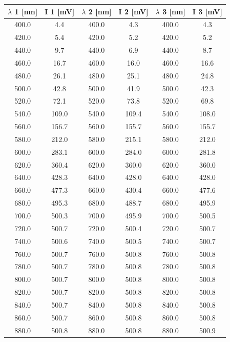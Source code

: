 \documentclass[]{article}
\begin{document}
\begin{table}[H]
\centering
\begin{tabular}{|c|c||c|c||c|c|}
\hline
$\lambda$ 1 [nm] & I 1 [mV] & $\lambda$ 2 [nm] & I 2 [mV] & $\lambda$ 3 [nm] & I 3 [mV] \\ \hline\hline
400.0 & 4.4 & 400.0 & 4.3 & 400.0 & 4.3 \\ \hline
420.0 & 5.4 & 420.0 & 5.2 & 420.0 & 5.2 \\ \hline
440.0 & 9.7 & 440.0 & 6.9 & 440.0 & 8.7 \\ \hline
460.0 & 16.7 & 460.0 & 16.0 & 460.0 & 16.6 \\ \hline
480.0 & 26.1 & 480.0 & 25.1 & 480.0 & 24.8 \\ \hline
500.0 & 42.8 & 500.0 & 41.9 & 500.0 & 42.3 \\ \hline
520.0 & 72.1 & 520.0 & 73.8 & 520.0 & 69.8 \\ \hline
540.0 & 109.0 & 540.0 & 109.4 & 540.0 & 108.0 \\ \hline
560.0 & 156.7 & 560.0 & 155.7 & 560.0 & 155.7 \\ \hline
580.0 & 212.0 & 580.0 & 215.1 & 580.0 & 212.0 \\ \hline
600.0 & 283.1 & 600.0 & 284.0 & 600.0 & 281.8 \\ \hline
620.0 & 360.4 & 620.0 & 360.0 & 620.0 & 360.0 \\ \hline
640.0 & 428.3 & 640.0 & 428.0 & 640.0 & 428.0 \\ \hline
660.0 & 477.3 & 660.0 & 430.4 & 660.0 & 477.6 \\ \hline
680.0 & 495.3 & 680.0 & 488.7 & 680.0 & 495.9 \\ \hline
700.0 & 500.3 & 700.0 & 495.9 & 700.0 & 500.5 \\ \hline
720.0 & 500.7 & 720.0 & 500.4 & 720.0 & 500.7 \\ \hline
740.0 & 500.6 & 740.0 & 500.5 & 740.0 & 500.7 \\ \hline
760.0 & 500.7 & 760.0 & 500.8 & 760.0 & 500.8 \\ \hline
780.0 & 500.7 & 780.0 & 500.8 & 780.0 & 500.8 \\ \hline
800.0 & 500.7 & 800.0 & 500.8 & 800.0 & 500.8 \\ \hline
820.0 & 500.7 & 820.0 & 500.8 & 820.0 & 500.8 \\ \hline
840.0 & 500.7 & 840.0 & 500.8 & 840.0 & 500.8 \\ \hline
860.0 & 500.7 & 860.0 & 500.8 & 860.0 & 500.8 \\ \hline
880.0 & 500.8 & 880.0 & 500.8 & 880.0 & 500.9 \\ \hline

\end{tabular}
\end{table}
\end{document}
